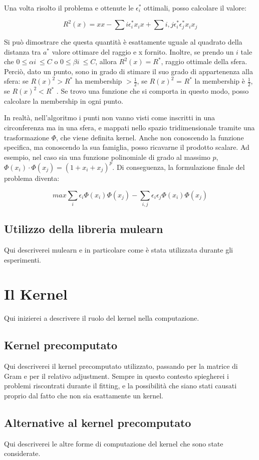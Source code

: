 \documentclass[12pt,a4paper]{report}
\begin{document}
Una volta risolto il problema e ottenute le $\epsilon_i^*$ ottimali, posso calcolare il valore:

\[ R^2(x) = xx - \sum{i}\epsilon_i^*x_ix + \sum{i,j}\epsilon_i^*\epsilon_j^*x_ix_j\]

Si può dimostrare che questa quantità è esattamente uguale al quadrato della distanza tra $a^*$ valore ottimare del raggio e x fornito. Inoltre,  se prendo un $i$ tale che $0 \leq \alpha{i}\ \leq C$ o $0 \leq \beta{i}\ \leq C$,  allora $R^2(x) = R^*$, raggio ottimale della sfera.
Perciò, dato un punto, sono in grado di stimare il suo grado di appartenenza alla sfera: se $R(x)^2 > R^*$ ha membership $>\frac{1}{2}$, se $R(x)^2$ = $R^*$ la membership è  $\frac{1}{2}$, se $R(x)^2  <R^*$ .
Se trovo una funzione che si comporta in questo modo, posso calcolare la membership in ogni punto.

In realtà, nell'algoritmo i punti non vanno visti come inscritti in una circonferenza ma in una sfera, e mappati nello spazio tridimensionale tramite una trasformazione $\Phi$, che viene definita kernel. Anche non conoscendo la funzione specifica, ma conoscendo la sua famiglia, posso ricavarne il prodotto scalare. Ad esempio, nel caso sia una funzione polinomiale di grado al massimo $p$, $\Phi(x_i)\cdot \Phi(x_j) = (1 + x_i + x_j)^p$.
Di conseguenza, la formulazione finale del problema diventa:

\[ max \sum_{i}\epsilon_i\Phi(x_i)\Phi(x_j) - \sum_{i,j}\epsilon_i\epsilon_j\Phi(x_i)\Phi(x_j)\]

\subsection{Utilizzo della libreria mulearn}
Qui descriverei mulearn e in particolare come è stata utilizzata durante gli esperimenti.
\section{Il Kernel}
Qui inizierei a descrivere il ruolo del kernel nella computazione.
\subsection{Kernel precomputato}
Qui descriverei il kernel precomputato utilizzato, passando per la matrice di Gram e per il relativo adjustment. Sempre in questo contesto spiegherei i problemi riscontrati durante il fitting, e la possibilità che siano stati causati proprio dal fatto che non sia esattamente un kernel.
\subsection{Alternative al kernel precomputato}
Qui descriverei le altre forme di computazione del kernel che sono state considerate.
\end{document}
